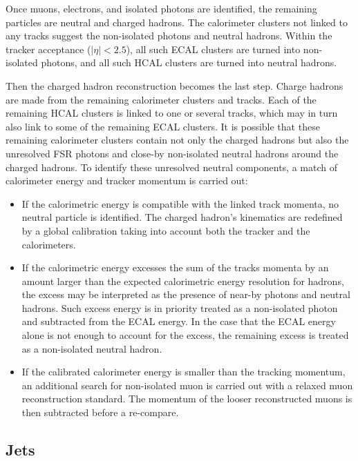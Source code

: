 Once muons, electrons, and isolated photons are identified, the remaining particles are neutral and charged hadrons. The calorimeter clusters not linked to any tracks suggest the non-isolated photons and neutral hadrons. Within the tracker acceptance ($|\eta|< 2.5$), all such ECAL clusters are turned into non-isolated photons, and all such HCAL clusters are turned into neutral hadrons. 

Then the charged hadron reconstruction becomes the last step. Charge hadrons are made from the remaining calorimeter clusters and tracks. Each of the remaining HCAL clusters is linked to one or several tracks, which may in turn also link to some of the remaining ECAL clusters. It is possible that these remaining calorimeter clusters contain not only the charged hadrons but also the unresolved FSR photons and close-by non-isolated neutral hadrons around the charged hadrons. To identify these unresolved neutral components, a match of calorimeter energy and tracker momentum is carried out:

\begin{itemize}
    \item If the calorimetric energy is compatible with the linked track momenta, no neutral particle is identified. The charged hadron's kinematics are redefined by a global calibration taking into account both the tracker and the calorimeters. 
    \item If the calorimetric energy excesses the sum of the tracks momenta by an amount larger than the expected calorimetric energy resolution for hadrons, the excess may be interpreted as the presence of near-by photons and neutral hadrons. Such excess energy is in priority treated as a non-isolated photon and subtracted from the ECAL energy. In the case that the ECAL energy alone is not enough to account for the excess, the remaining excess is treated as a non-isolated neutral hadron. 
    \item If the calibrated calorimeter energy is smaller than the tracking momentum, an additional search for non-isolated muon is carried out with a relaxed muon reconstruction standard. The momentum of the looser reconstructed muons is then subtracted before a re-compare.
\end{itemize}







\subsection{Jets}
\label{sec:cmsExperiment:reconstruction:jet}



